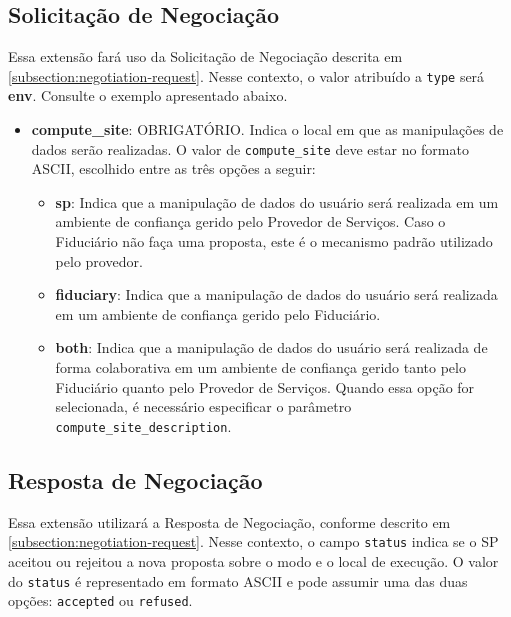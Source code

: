 \subsection{Solicitação de Negociação}

Essa extensão fará uso da Solicitação de Negociação descrita em \autoref{subsection:negotiation-request}. Nesse contexto, o valor atribuído a \texttt{type} será \textbf{env}. Consulte o exemplo apresentado abaixo.



\begin{itemize}

    \item \textbf{compute\_site}: OBRIGATÓRIO. Indica o local em que as manipulações de dados serão realizadas. O valor de \texttt{compute\_site} deve estar no formato ASCII, escolhido entre as três opções a seguir:

    \begin{itemize}
    
        \item \textbf{sp}: Indica que a manipulação de dados do usuário será realizada em um ambiente de confiança gerido pelo Provedor de Serviços. Caso o Fiduciário não faça uma proposta, este é o mecanismo padrão utilizado pelo provedor.
        
        \item \textbf{fiduciary}: Indica que a manipulação de dados do usuário será realizada em um ambiente de confiança gerido pelo Fiduciário.
        
        \item \textbf{both}: Indica que a manipulação de dados do usuário será realizada de forma colaborativa em um ambiente de confiança gerido tanto pelo Fiduciário quanto pelo Provedor de Serviços. Quando essa opção for selecionada, é necessário especificar o parâmetro \texttt{compute\_site\_description}.
   
    \end{itemize}

\end{itemize}


\subsection{Resposta de Negociação}

Essa extensão utilizará a Resposta de Negociação, conforme descrito em \autoref{subsection:negotiation-request}. Nesse contexto, o campo \texttt{status} indica se o \acs{SP} aceitou ou rejeitou a nova proposta sobre o modo e o local de execução. O valor do \texttt{status} é representado em formato ASCII e pode assumir uma das duas opções: \texttt{accepted} ou \texttt{refused}.

